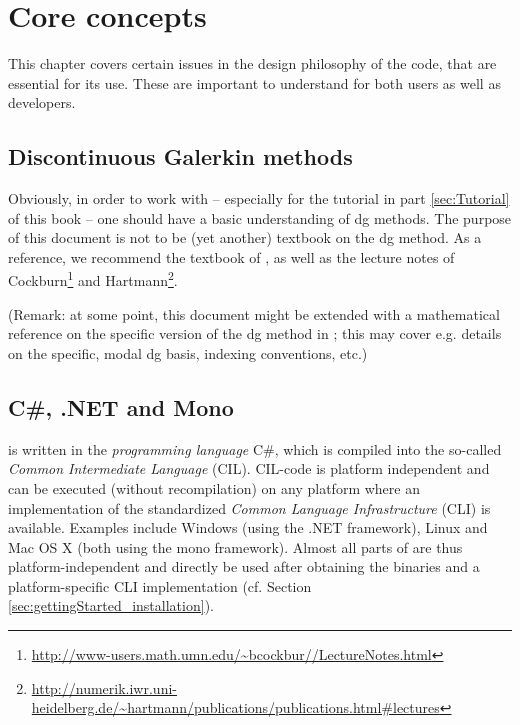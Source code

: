 \documentclass[a4paper,10pt]{report} %
\begin{document}
\chapter{Core concepts}
\label{sec:coreConcepts}

This chapter covers certain issues in the design philosophy of the code, that are essential for its use. 
These are important to understand for both users as well as developers.

\section{Discontinuous Galerkin methods}
\label{sec:coreConcepts_dgMethods}
Obviously, in order to work with \BoSSS{} -- especially for the tutorial in part \ref{sec:Tutorial}
of this book -- one should have a basic understanding of \ac{dg} methods.
The purpose of this document is not to be (yet another) textbook on the \ac{dg} method.
As a reference, we recommend the textbook of \textcite{DiPietroErn2011},
as well as the lecture notes of Cockburn\footnote{
\url{http://www-users.math.umn.edu/~bcockbur//LectureNotes.html}}
and Hartmann\footnote{
\url{http://numerik.iwr.uni-heidelberg.de/~hartmann/publications/publications.html\#lectures}}.

(Remark: at some point, this document might be extended with a mathematical
reference on the specific version of the \ac{dg} method in \BoSSS; this may cover e.g.
details on the specific, modal \ac{dg} basis, indexing conventions, etc.)


\section{C\#, .NET and Mono}
\label{sec:coreConcepts_CsharpAndDotnet}
\BoSSS{} is written in the \emph{programming language} C\#, which is compiled into the so-called 
\emph{Common Intermediate Language} (CIL). CIL-code is platform independent and can be executed (without recompilation) 
on any platform where an implementation of the standardized \emph{Common Language Infrastructure} (CLI) is available. 
Examples include Windows (using the .NET framework), Linux and Mac OS X (both using the mono framework). 
Almost all parts of \BoSSS{} are thus platform-independent and directly be used after obtaining the \BoSSS{} binaries 
and a platform-specific CLI implementation (cf. Section \ref{sec:gettingStarted_installation}).
\end{document}
